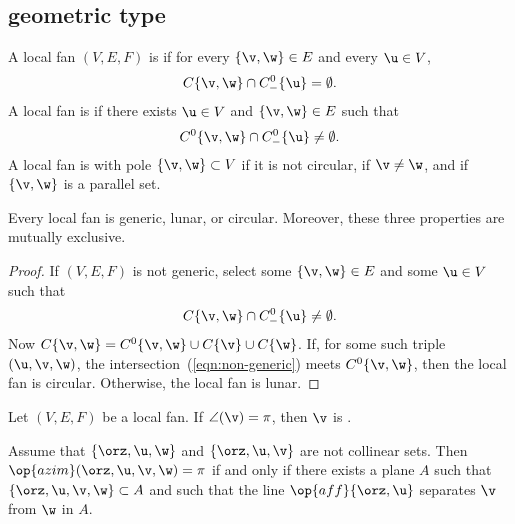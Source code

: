 \subsection{geometric type}\label{sec:types}

\begin{definition}
A local fan $(V,E,F)$ is   if for every $\{\v,\w\}\in E$
and every $\u\in V$, 
\begin{displaymath}
C\{\v,\w\}\cap C^0_-\{\u\} = \emptyset.
\end{displaymath}
A local fan is   if there exists $\u\in V$ and
$\{\v,\w\}\in E$ such that
\begin{displaymath}
C^0\{\v,\w\}\cap C^0_-\{\u\}\ne \emptyset.
\end{displaymath}
A local fan is  with pole $\{\v,\w\} \subset V$ if it is not
circular, if $\v\ne\w$, and if $\{\v,\w\}$ is a parallel set.
\end{definition}
%
%
%


\begin{lemma}[] Every local fan is
generic, lunar, or circular.  Moreover, these three properties are
mutually exclusive.
\end{lemma}
%
%
%
%
%

\begin{proof} If $(V,E,F)$ is not generic,  select some $\{\v,\w\}\in E$
and some $\u\in V$ such that
\begin{equation}\label{eqn:non-generic}
C\{\v,\w\}\cap C^0_-\{\u\} \ne \emptyset.
\end{equation}
Now $C\{\v,\w\} = C^0\{\v,\w\} \cup C\{\v\}\cup C\{\w\}$.  If, for
some such triple $(\u,\v,\w)$, the
intersection~(\ref{eqn:non-generic}) meets $C^0\{\v,\w\}$, then the
local fan is circular.  Otherwise, the local fan is lunar.
\end{proof}

\begin{definition}[flat]
 Let $(V,E,F)$ be a local fan.
If $\angle(\v)=\pi$, then $\v$ is .
\end{definition}


\begin{lemma}[]  \label{lemma:coplanar}
Assume that $\{\orz,\u,\w\}$ and $\{\orz,\u,\v\}$ are not collinear sets.
Then $\op{azim}(\orz,\u,\v,\w)=\pi$ if and only if
there exists a plane $A$ such that $\{\orz,\u,\v,\w\}\subset A$
and such that the line $\op{aff}\{\orz,\u\}$ separates $\v$ from
$\w$ in $A$.
\end{lemma}

